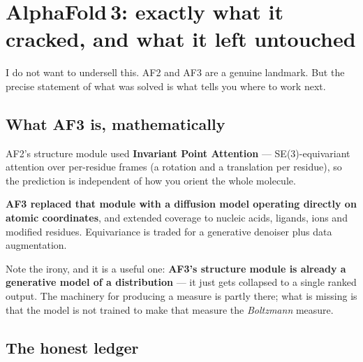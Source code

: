 \clearpage
\renewcommand{\sectioncolor}{ember}
\section{AlphaFold\,3: exactly what it cracked, and what it left untouched}

I do not want to undersell this. AF2 and AF3 are a genuine landmark. But the precise statement of
what was solved is what tells you where to work next.

\subsection{What AF3 is, mathematically}

\begin{evidence}[title={Abramson et al., \textit{Nature} \textbf{630}, 493 (May 2024)}]
AF2's structure module used \textbf{Invariant Point Attention} --- SE(3)-equivariant attention over
per-residue frames (a rotation and a translation per residue), so the prediction is independent of
how you orient the whole molecule.

\textbf{AF3 replaced that module with a diffusion model operating directly on atomic coordinates},
and extended coverage to nucleic acids, ligands, ions and modified residues. Equivariance is traded
for a generative denoiser plus data augmentation.
\end{evidence}

\noindent Note the irony, and it is a useful one: \textbf{AF3's structure module is already a
generative model of a distribution} --- it just gets collapsed to a single ranked output. The
machinery for producing a measure is partly there; what is missing is that the model is not trained
to make that measure the \emph{Boltzmann} measure.

\subsection{The honest ledger}

